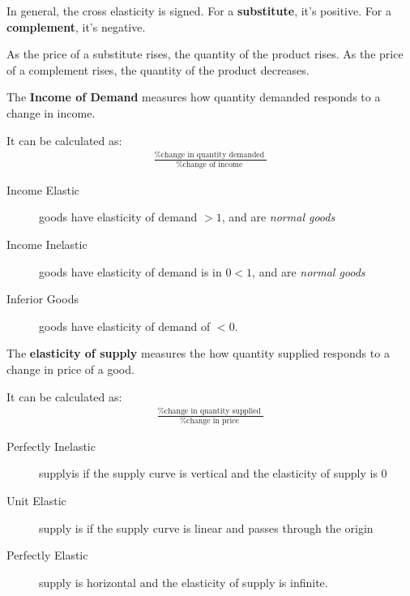                 In general, the cross elasticity is signed.
                For a \textbf{substitute}, it's positive.
                For a \textbf{complement}, it's negative.

                As the price of a substitute rises, the quantity of the product rises.
                As the price of a complement rises, the quantity of the product decreases.

                The \textbf{Income of Demand} measures how quantity demanded responds to a change in income.

                It can be calculated as:
                \begin{align*}
                    \frac{\text{
                    \% change in quantity demanded
                    }}{\text{
                    \% change of income
                    }}
                \end{align*}
                \begin{description}
                    \item[Income Elastic]  goods have elasticity of demand $>1$, and are \emph{normal goods}
                    \item[Income Inelastic]  goods have elasticity of demand is in $0<1$, and are \emph{normal goods}
                    \item[Inferior Goods]  goods have elasticity of demand of $<0$.
                \end{description}

                The \textbf{elasticity of supply} measures the how quantity supplied responds to a change in price of a good.

                It can be calculated as:
                \begin{align*}
                    \frac{\text{
                    \% change in quantity supplied
                    }}{\text{
                    \% change in price
                    }}
                \end{align*}

                \begin{description}
                    \item[Perfectly Inelastic] supplyis if the supply curve is vertical and the elasticity of supply is $0$
                    \item[Unit Elastic] supply is if the supply curve is linear and passes through the origin
                    \item[Perfectly Elastic] supply is horizontal and the elasticity of supply is infinite.
                \end{description}

